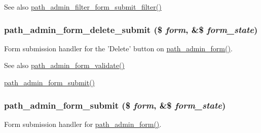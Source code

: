 \begin{DoxySeeAlso}{See also}
\hyperlink{path_8admin_8inc_a250d1de05853ce7562fb1b9530dba273}{path\_\-admin\_\-filter\_\-form\_\-submit\_\-filter()} 
\end{DoxySeeAlso}
\hypertarget{path_8admin_8inc_af54710cda76e928325030bf33414b8d3}{
\subsubsection[{path\_\-admin\_\-form\_\-delete\_\-submit}]{\setlength{\rightskip}{0pt plus 5cm}path\_\-admin\_\-form\_\-delete\_\-submit (\$ {\em form}, \/  \&\$ {\em form\_\-state})}}
\label{path_8admin_8inc_af54710cda76e928325030bf33414b8d3}
Form submission handler for the 'Delete' button on \hyperlink{group__forms_ga712dc47396e1cfb8f1872920973db244}{path\_\-admin\_\-form()}.

\begin{DoxySeeAlso}{See also}
\hyperlink{path_8admin_8inc_a4251683f0b26edf9f54db68f4aa5e0b3}{path\_\-admin\_\-form\_\-validate()} 

\hyperlink{path_8admin_8inc_a9e4a6b6f202fad04dcdb2bbcd800d168}{path\_\-admin\_\-form\_\-submit()} 
\end{DoxySeeAlso}
\hypertarget{path_8admin_8inc_a9e4a6b6f202fad04dcdb2bbcd800d168}{
\subsubsection[{path\_\-admin\_\-form\_\-submit}]{\setlength{\rightskip}{0pt plus 5cm}path\_\-admin\_\-form\_\-submit (\$ {\em form}, \/  \&\$ {\em form\_\-state})}}
\label{path_8admin_8inc_a9e4a6b6f202fad04dcdb2bbcd800d168}
Form submission handler for \hyperlink{group__forms_ga712dc47396e1cfb8f1872920973db244}{path\_\-admin\_\-form()}.

